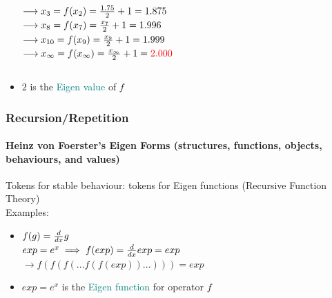 \documentclass[
	11pt,
	aspectratio=169,
]{beamer}
\begin{document}
\begin{frame}
\begin{itemize}
\begin{columns}
                                    $\longrightarrow x_3=f(x_2) = {{1.75}\over{2}} + 1 = 1.875$\\
                                    $\longrightarrow x_8=f(x_7) = {{x_7}\over{2}} + 1 = 1.996$\\
                                    $\longrightarrow x_{10}=f(x_9) = {{x_9}\over{2}} + 1 = 1.999$\\
                                    $\longrightarrow x_\infty=f(x_\infty) = {{x_\infty}\over{2}} + 1 = \textcolor{red}{2.000}$\\ 
                            \end{columns}
                        \item<2-> $2$ is the \textcolor{teal}{Eigen value} of $f$
                    \end{itemize}
                \end{frame}
                \begin{frame}
                    \frametitle{Recursion/Repetition}
                    \framesubtitle{Heinz von Foerster's Eigen Forms (structures, functions, objects, behaviours, and values)}
                    Tokens for stable behaviour: tokens for Eigen functions (Recursive Function Theory)\\
                    Examples:
                    \begin{itemize}
                        \item<1-> $f(g)= {{d}\over{dx}}g$\\
                            $exp=e^x \implies f(exp) = {{d}\over{dx}}exp = exp$\\
                            $\longrightarrow f(f(f(...f(f(exp))...))) = exp$\\
                        \item<2-> $exp = e^x$ is the \textcolor{teal}{Eigen function} for operator $f$
                    \end{itemize}
                \end{frame}
\end{document}
